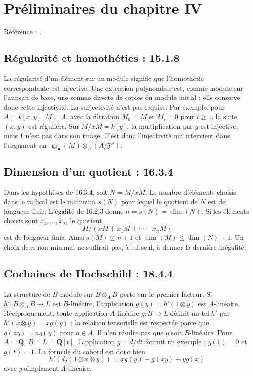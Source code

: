 \documentclass[11pt,a4paper]{article}
\begin{document}
\section{Préliminaires du chapitre IV}
\label{part:iv1}
Référence : \cite{EGAIV1}.
\subsection{Régularité et homothéties : 15.1.8}
\label{note:iv1-1}
La régularité d'un élément sur un module signifie que l'homothétie
correspondante est injective. Une extension polynomiale est, comme module
sur l'anneau de base, une somme directe de copies du module initial ; elle
conserve donc cette injectivité. La surjectivité n'est pas requise.
Par exemple, pour $A=k[x,y]$, $M=A$, avec la filtration $M_0=M$ et
$M_i=0$ pour $i\geq1$, la suite $(x,y)$ est régulière. Sur
$M/xM=k[y]$, la multiplication par $y$ est injective, mais $1$ n'est
pas dans son image. C'est donc l'injectivité qui intervient dans
l'argument sur $\operatorname{gr}_\bullet(M)\otimes_A(A/\mathfrak J'')$.

\subsection{Dimension d'un quotient : 16.3.4}
\label{note:iv1-2}
Dans les hypothèses de 16.3.4, soit $N=M/xM$. Le nombre d'éléments
choisis dans le radical est le minimum $s(N)$ pour lequel le quotient
de $N$ est de longueur finie. L'égalité de 16.2.3 donne
$n=s(N)=\dim(N)$. Si les éléments choisis sont $x_1,\ldots,x_n$,
le quotient
\[
 M/(xM+x_1M+\cdots+x_nM)
\]
est de longueur finie. Ainsi $s(M)\leq n+1$ et
$\dim(M)\leq\dim(N)+1$. Un choix de $n$ non minimal ne suffirait
pas, à lui seul, à donner la dernière inégalité.

\subsection{Cochaines de Hochschild : 18.4.4}
\label{note:iv1-3}
La structure de $B$-module sur $B\otimes_A B$ porte sur le premier
facteur. Si $h':B\otimes_A B\to L$ est $B$-linéaire, l'application
$g(y)=h'(1\otimes y)$ est $A$-linéaire. Réciproquement, toute
application $A$-linéaire $g:B\to L$ définit un tel $h'$ par
$h'(x\otimes y)=xg(y)$ : la relation tensorielle est respectée parce
que $g(ay)=ag(y)$ pour $a\in A$.
Il n'en résulte pas que $g$ soit $B$-linéaire. Pour
$A=\mathbf Q$, $B=L=\mathbf Q[t]$, l'application $g=d/dt$ fournit
un exemple : $g(1)=0$ et $g(t)=1$.
La formule du cobord est donc bien
\[
 h'(d_2(1\otimes x\otimes y))=xg(y)-g(xy)+yg(x)
\]
avec $g$ simplement $A$-linéaire.
\end{document}
